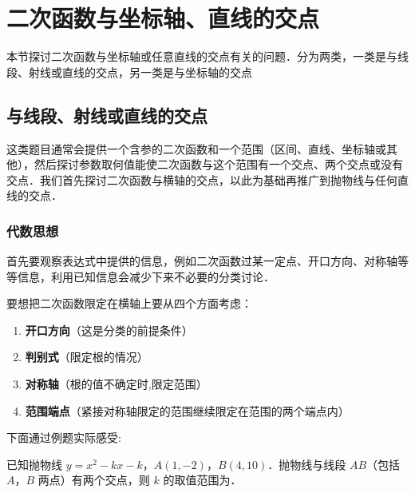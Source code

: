 \section{二次函数与坐标轴、直线的交点}

本节探讨二次函数与坐标轴或任意直线的交点有关的问题．分为两类，一类是与线段、射线或直线的交点，另一类是与坐标轴的交点
\subsection{与线段、射线或直线的交点}
这类题目通常会提供一个含参的二次函数和一个范围（区间、直线、坐标轴或其他），然后探讨参数取何值能使二次函数与这个范围有一个交点、两个交点或没有交点．我们首先探讨二次函数与横轴的交点，以此为基础再推广到抛物线与任何直线的交点．
\subsubsection*{代数思想}






首先要观察表达式中提供的信息，例如二次函数过某一定点、开口方向、对称轴等等信息，利用已知信息会减少下来不必要的分类讨论．

要想把二次函数限定在横轴上要从四个方面考虑：
\begin{enumerate}
    \item \textbf{开口方向}（这是分类的前提条件）
    \item \textbf{判别式}（限定根的情况）
    \item \textbf{对称轴}（根的值不确定时,限定范围）
    \item \textbf{范围端点}（紧接对称轴限定的范围继续限定在范围的两个端点内）
\end{enumerate}

下面通过例题实际感受:

\begin{example}
    已知抛物线 \( y = x^2 - kx - k \)，\( A (1, -2) \)，\( B (4, 10) \)．抛物线与线段 \( AB \)（包括 \( A \)，\( B \) 两点）有两个交点，则 \( k \) 的取值范围为\underline{\hspace{4.5em}}．
\end{example}

